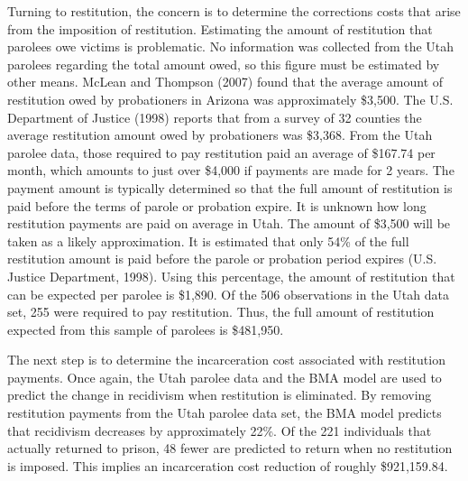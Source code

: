 Turning to restitution, the concern is to determine the corrections costs that arise from the imposition of restitution.  Estimating the amount of restitution that parolees owe victims is problematic.  No information was collected from the Utah parolees regarding the total amount owed, so this figure must be estimated by other means.  McLean and Thompson (2007) found that the average amount of restitution owed by probationers in Arizona was approximately \$3,500.  The U.S. Department of Justice (1998) reports that from a survey of 32 counties the average restitution amount owed by probationers was \$3,368. From the Utah parolee data, those required to pay restitution paid an average of \$167.74 per month, which amounts to just over \$4,000 if payments are made for 2 years.  The payment amount is typically determined so that the full amount of restitution is paid before the terms of parole or probation expire.  It is unknown how long restitution payments are paid on average in Utah.  The amount of \$3,500 will be taken as a likely approximation.  It is estimated that only 54\% of the full restitution amount is paid before the parole or probation period expires (U.S. Justice Department, 1998).  Using this percentage, the amount of restitution that can be expected per parolee is \$1,890.  Of the 506 observations in the Utah data set, 255 were required to pay restitution.  Thus, the full amount of restitution expected from this sample of parolees is \$481,950.

The next step is to determine the incarceration cost associated with restitution payments.  Once again, the Utah parolee data and the BMA model are used to predict the change in recidivism when restitution is eliminated.  By removing restitution payments from the Utah parolee data set, the BMA model predicts that recidivism decreases by approximately 22\%.  Of the 221 individuals that actually returned to prison, 48 fewer are predicted to return when no restitution is imposed.  This implies an incarceration cost reduction of roughly \$921,159.84.

